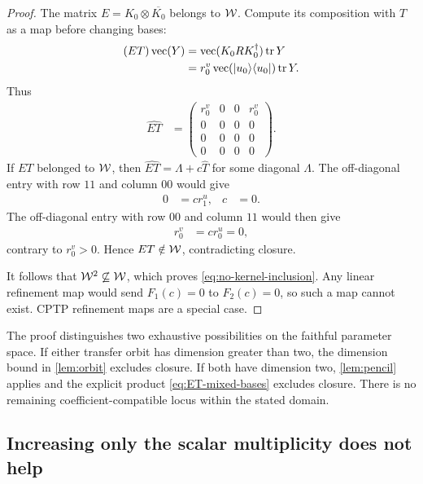 \begin{proof}
	The matrix $E=K_0\otimes\overline{K_0}$ belongs to $\mathcal{W}$.
	Compute its composition with $T$ as a map before changing bases:
	\begin{align}
		(ET)\operatorname{vec}(Y)
		 & =\operatorname{vec}(K_0RK_0^\dagger)\operatorname{tr} Y
		\nonumber                                             \\
		 & =r_0^v\operatorname{vec}(\lvert u_0\rangle\langle u_0\rvert)\operatorname{tr} Y.
	\end{align}
	Thus
	\begin{align}
		\widehat{ET}
		 & =
		\begin{pmatrix}
			r_0^v & 0 & 0 & r_0^v \\
			0     & 0 & 0 & 0     \\
			0     & 0 & 0 & 0     \\
			0     & 0 & 0 & 0
		\end{pmatrix}.
		\label{eq:ET-mixed-bases}
	\end{align}
	If $ET$ belonged to $\mathcal{W}$, then
	$\widehat{ET}=\Lambda+c\widehat T$ for some diagonal $\Lambda$.
	The off-diagonal entry with row $11$ and column $00$ would give
	\begin{align}
		0 & =c r_1^u,
		  &
		c & =0.
	\end{align}
	The off-diagonal entry with row $00$ and column $11$ would then give
	\begin{align}
		r_0^v & =c r_0^u=0,
	\end{align}
	contrary to $r_0^v>0$. Hence $ET\notin\mathcal{W}$, contradicting closure.

	It follows that $\mathcal{W}^2\not\subseteq\mathcal{W}$, which proves
	\cref{eq:no-kernel-inclusion}. Any linear refinement map would send
	$F_1(c)=0$ to $F_2(c)=0$, so such a map cannot exist.
	CPTP refinement maps are a special case.
\end{proof}

The proof distinguishes two exhaustive possibilities on the faithful
parameter space. If either transfer orbit has dimension greater
than two, the dimension bound in \cref{lem:orbit} excludes closure.
If both have dimension two, \cref{lem:pencil} applies and the explicit
product \cref{eq:ET-mixed-bases} excludes closure. There is no remaining
coefficient-compatible locus within the stated domain.

\subsection{Increasing only the scalar multiplicity does not help}

